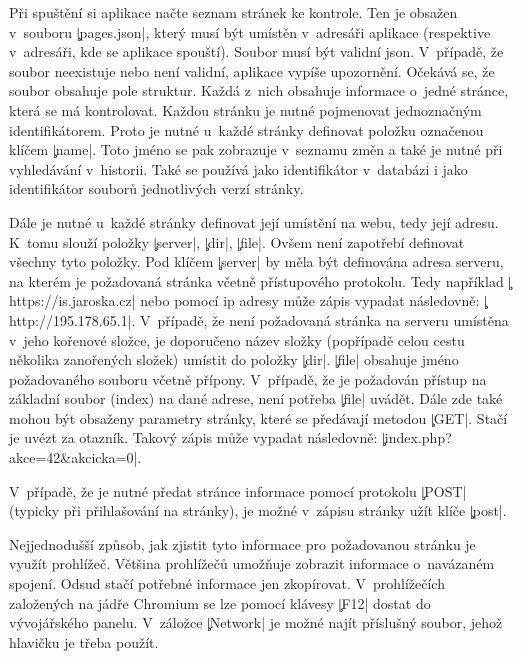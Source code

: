 
Při spuštění si aplikace načte seznam stránek ke kontrole.
Ten je obsažen v~souboru \c|pages.json|, který musí být umístěn v~adresáři aplikace (respektive v~adresáři, kde se aplikace spouští).
Soubor musí být validní json.
V~případě, že soubor neexistuje nebo není validní, aplikace vypíše upozornění. %
Očekává se, že soubor obsahuje pole struktur.
Každá z~nich obsahuje informace o~jedné stránce, která se má kontrolovat.
Každou stránku je nutné pojmenovat jednoznačným identifikátorem.
Proto je nutné u~každé stránky definovat položku označenou klíčem \c|name|.
Toto jméno se pak zobrazuje v~seznamu změn a také je nutné při vyhledávání v~historii.
Také se používá jako identifikátor v~databázi i jako identifikátor souborů jednotlivých verzí stránky.

Dále je nutné u~každé stránky definovat její umístění na webu, tedy její adresu.
K~tomu slouží položky \c|server|, \c|dir|, \c|file|.
Ovšem není zapotřebí definovat všechny tyto položky.
Pod klíčem \c|server| by měla být definována adresa serveru, na kterém je požadovaná stránka včetně přístupového protokolu.
Tedy například \c|https://is.jaroska.cz| nebo pomocí ip adresy může zápis vypadat následovně: \c|http://195.178.65.1|.
V~případě, že není požadovaná stránka na serveru umístěna v~jeho kořenové složce, je doporučeno název složky (popřípadě celou cestu několika zanořených složek) umístit do položky \c|dir|.
\c|file| obsahuje jméno požadovaného souboru včetně přípony.
V~případě, že je požadován přístup na základní soubor (index) na dané adrese, není potřeba \c|file| uvádět.
Dále zde také mohou být obsaženy parametry stránky, které se předávají metodou \c|GET|.
Stačí je uvézt za otazník.
Takový zápis může vypadat následovně: \c|index.php?akce=42&akcicka=0|.

V~případě, že je nutné předat stránce informace pomocí protokolu \c|POST| (typicky při přihlašování na stránky), 
je možné v~zápisu stránky užít klíče \c|post|.

Nejjednodušší způsob, jak zjistit tyto informace pro požadovanou stránku je využít prohlížeč.
Většina prohlížečů umožňuje zobrazit informace o~navázaném spojení.
Odsud stačí potřebné informace jen zkopírovat.
V~prohlížečích založených na jádře Chromium se lze pomocí klávesy \c|F12| dostat do vývojářského panelu.
V~záložce \c|Network| je možné najít příslušný soubor, jehož hlavičku je třeba použít.

